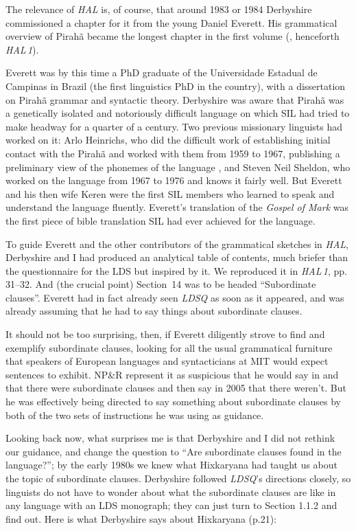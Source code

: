 \documentclass[output=paper,colorlinks,citecolor=brown
]{langscibook}
\begin{document}
The relevance of \textit{HAL} is, of course, that around 1983 or 1984
Derbyshire commissioned a chapter for it from the young Daniel Everett.
His grammatical overview of Pirah{\~a} became the longest chapter in
the first volume (\citealt{DerbPull86}, henceforth \textit{HAL\,1}).

Everett was by this time a PhD graduate of the Universidade Estadual
de Campinas in Brazil (the first linguistics PhD in the country),
with a dissertation on Pirah{\~a} grammar and syntactic theory.
Derbyshire was aware that Pirah{\~a} was a genetically isolated and
notoriously difficult language on which SIL had tried to make headway
for a quarter of a century. Two previous missionary linguists had
worked on it: Arlo Heinrichs, who did the difficult work of
establishing initial contact with the Pirah{\~a} and worked with them
from 1959 to 1967, publishing a preliminary view of the phonemes of
the language \citep{Heinrichs64}, and Steven Neil Sheldon, who worked
on the language from 1967 to 1976 and knows it fairly well. But Everett
and his then wife Keren were the first SIL members who learned to
speak and understand the language fluently. Everett's translation of
the \textit{Gospel of Mark} \citep{Everett86Mark} was the first piece
of bible translation SIL had ever achieved for the language.

To guide Everett and the other contributors of the grammatical sketches
in \textit{HAL}, Derbyshire and I had produced an analytical table
of contents, much briefer than the questionnaire for the LDS but
inspired by it. We reproduced it in \textit{HAL\,1}, pp.\,31--32.
And (the crucial point) Section~14 was to be headed ``Subordinate
clau\-ses''. Everett had in fact already seen \textit{LDSQ} as soon as
it appeared, and was already assuming that he had to say things about
subordinate clauses.

It should not be too surprising, then, if Everett diligently strove
to find and exemplify subordinate clauses, looking for all the usual
grammatical furniture that speakers of European languages and
syntacticians at MIT would expect sentences to exhibit. NP\&R represent
it as suspicious that he would say in \citeyear{Everett83} and
\citeyear{Everett86HAL} that there were subordinate clauses and then
say in 2005 that there weren't. But he was effectively being directed
to say something about subordinate clauses by both of the two sets of
instructions he was using as guidance.

Looking back now, what surprises me is that Derbyshire and I did not rethink
our guidance, and change the question to ``Are subordinate clauses found
in the language?''; by the early 1980s we knew what Hixkaryana had
taught us about the topic of subordinate clauses. Derbyshire followed
\textit{LDSQ}'s directions closely, so linguists do not have to wonder
about what the subordinate clauses are like in any language with an
LDS monograph; they can just turn to Section 1.1.2 and find out. Here
is what Derbyshire says about Hixkaryana (p.21):
\end{document}
